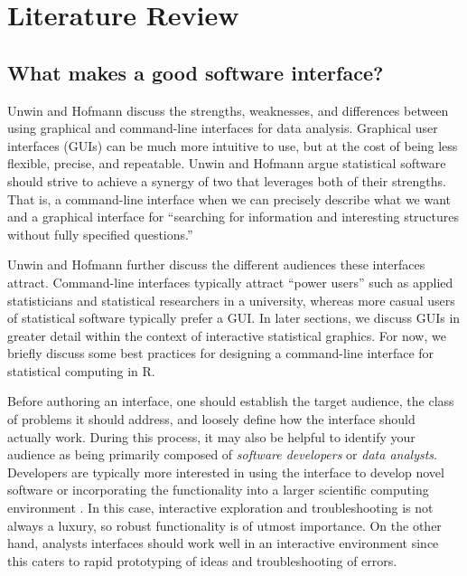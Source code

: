 \documentclass[11pt]{isuthesis}
\begin{document}


\tableofcontents
{} \cleardoublepage {}
{}
\listoftables
\cleardoublepage {} {}
\listoffigures



\chapter{Literature Review}\label{literature-review}

\section{What makes a good software
interface?}\label{what-makes-a-good-software-interface}

Unwin and Hofmann \citep{Unwin:1999vp} discuss the strengths,
weaknesses, and differences between using graphical and command-line
interfaces for data analysis. Graphical user interfaces (GUIs) can be
much more intuitive to use, but at the cost of being less flexible,
precise, and repeatable. Unwin and Hofmann argue statistical software
should strive to achieve a synergy of two that leverages both of their
strengths. That is, a command-line interface when we can precisely
describe what we want and a graphical interface for ``searching for
information and interesting structures without fully specified
questions.''

Unwin and Hofmann further discuss the different audiences these
interfaces attract. Command-line interfaces typically attract ``power
users'' such as applied statisticians and statistical researchers in a
university, whereas more casual users of statistical software typically
prefer a GUI. In later sections, we discuss GUIs in greater detail
within the context of interactive statistical graphics. For now, we
briefly discuss some best practices for designing a command-line
interface for statistical computing in R.

Before authoring an interface, one should establish the target audience,
the class of problems it should address, and loosely define how the
interface should actually work. During this process, it may also be
helpful to identify your audience as being primarily composed of
\emph{software developers} or \emph{data analysts}. Developers are
typically more interested in using the interface to develop novel
software or incorporating the functionality into a larger scientific
computing environment \citep{embedded-computing}. In this case,
interactive exploration and troubleshooting is not always a luxury, so
robust functionality is of utmost importance. On the other hand,
analysts interfaces should work well in an interactive environment since
this caters to rapid prototyping of ideas and troubleshooting of errors.
\end{document}
